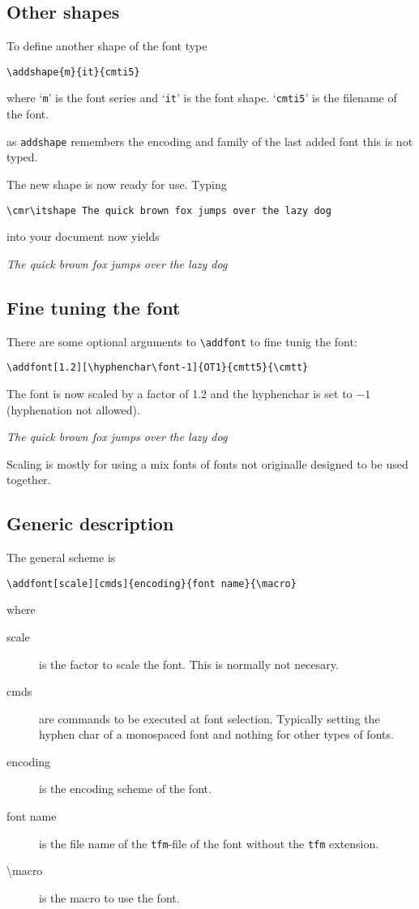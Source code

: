\documentclass[12pt,british,parskip=half]{scrartcl}
\begin{document}
\subsection{Other shapes}
\label{sec:other-shapes}

To define another shape of the font type
\begin{lstlisting}
\addshape{m}{it}{cmti5}
\end{lstlisting}
where `\lstinline|m|' is the font series and `\lstinline|it|' is the
font shape. `\lstinline|cmti5|' is the filename of the font.

as \lstinline|addshape| remembers the encoding and family of the last
added font this is not typed.

The new shape is now ready for use. Typing 
\begin{lstlisting}[morekeywords=cmr]
\cmr\itshape The quick brown fox jumps over the lazy dog
\end{lstlisting}
into your document now yields

{\cmr\itshape The quick brown fox jumps over the lazy dog}

\subsection{Fine tuning the font}
\label{sec:fine-tuning-font}

There are some optional arguments to \lstinline|\addfont| to fine
tunig the font:
\begin{lstlisting}
\addfont[1.2][\hyphenchar\font-1]{OT1}{cmtt5}{\cmtt}
\end{lstlisting}
The font is now scaled by a factor of 1.2 and the hyphenchar is set to
$-1$ (hyphenation not allowed).

{\cmtt\itshape The quick brown fox jumps over the lazy dog}

Scaling is mostly for using a mix fonts of fonts not originalle
designed to be used together.

\subsection{Generic description}
\label{sec:generic-description}

The general scheme is
\begin{lstlisting}
\addfont[scale][cmds]{encoding}{font name}{\macro}
\end{lstlisting}

where 
\begin{description}
\item[scale] is the factor to scale the font. This is normally not
  necesary.
\item[cmds] are commands to be executed at font selection. Typically
  setting the hyphen char of a monospaced font and nothing for other
  types of fonts.
\item[encoding] is the encoding scheme of the font.
\item[font name] is the file name of the \texttt{tfm}-file of the font
  without the \texttt{tfm} extension.
\item[\textbackslash macro] is the macro to use the font.
\end{description}
\end{document}
